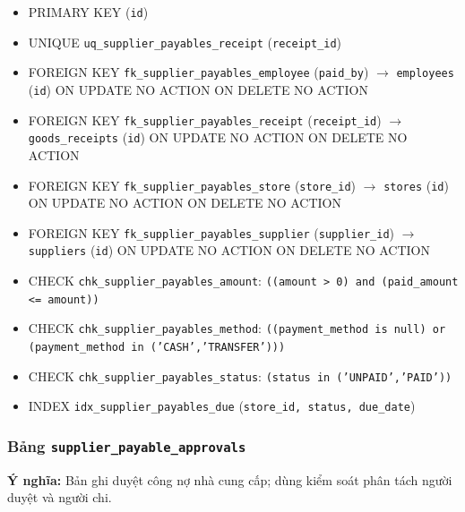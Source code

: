 \begin{itemize}

\item PRIMARY KEY (\texttt{id})

\item UNIQUE \texttt{uq\_supplier\_payables\_receipt} (\texttt{receipt\_id})

\item FOREIGN KEY \texttt{fk\_supplier\_payables\_employee} (\texttt{paid\_by}) $\rightarrow$ \texttt{employees} (\texttt{id}) ON UPDATE NO ACTION ON DELETE NO ACTION

\item FOREIGN KEY \texttt{fk\_supplier\_payables\_receipt} (\texttt{receipt\_id}) $\rightarrow$ \texttt{goods\_receipts} (\texttt{id}) ON UPDATE NO ACTION ON DELETE NO ACTION

\item FOREIGN KEY \texttt{fk\_supplier\_payables\_store} (\texttt{store\_id}) $\rightarrow$ \texttt{stores} (\texttt{id}) ON UPDATE NO ACTION ON DELETE NO ACTION

\item FOREIGN KEY \texttt{fk\_supplier\_payables\_supplier} (\texttt{supplier\_id}) $\rightarrow$ \texttt{suppliers} (\texttt{id}) ON UPDATE NO ACTION ON DELETE NO ACTION

\item CHECK \texttt{chk\_supplier\_payables\_amount}: \texttt{((amount > 0) and (paid\_amount <= amount))}

\item CHECK \texttt{chk\_supplier\_payables\_method}: \texttt{((payment\_method is null) or (payment\_method in ('CASH','TRANSFER')))}

\item CHECK \texttt{chk\_supplier\_payables\_status}: \texttt{(status in ('UNPAID','PAID'))}

\item INDEX \texttt{idx\_supplier\_payables\_due} (\texttt{store\_id, status, due\_date})

\end{itemize}

\subsubsection{Bảng \texttt{supplier\_payable\_approvals}}

\textbf{Ý nghĩa:} Bản ghi duyệt công nợ nhà cung cấp; dùng kiểm soát phân tách người duyệt và người chi.\par

